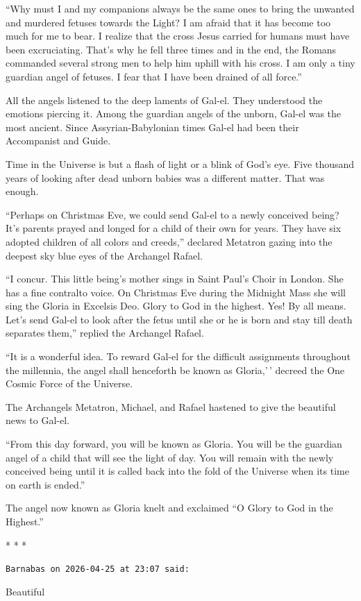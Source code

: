 ``Why must I and my companions always be the same ones to bring the unwanted and murdered fetuses towards the Light? I am afraid that it has become too much for me to bear. I realize that the cross Jesus carried for humans must have been excruciating. That's why he fell three times and in the end, the Romans commanded several strong men to help him uphill with his cross. I am only a tiny guardian angel of fetuses. I fear that I have been drained of all force.''

All the angels listened to the deep laments of Gal-el. They understood the emotions piercing it. Among the guardian angels of the unborn, Gal-el was the most ancient. Since Assyrian-Babylonian times Gal-el had been their Accompanist and Guide.

Time in the Universe is but a flash of light or a blink of God's eye. Five thousand years of looking after dead unborn babies was a different matter. That was enough.

``Perhaps on Christmas Eve, we could send Gal-el to a newly conceived being? It's parents prayed and longed for a child of their own for years. They have six adopted children of all colors and creeds,'' declared Metatron gazing into the deepest sky blue eyes of the Archangel Rafael.

``I concur. This little being's mother sings in Saint Paul's Choir in London. She has a fine contralto voice. On Christmas Eve during the Midnight Mass she will sing the Gloria in Excelsis Deo. Glory to God in the highest. Yes! By all means. Let's send Gal-el to look after the fetus until she or he is born and stay till death separates them,'' replied the Archangel Rafael.

``It is a wonderful idea. To reward Gal-el for the difficult assignments throughout the millennia, the angel shall henceforth be known as Gloria,'\,' decreed the One Cosmic Force of the Universe.

The Archangels Metatron, Michael, and Rafael hastened to give the beautiful news to Gal-el.

``From this day forward, you will be known as Gloria. You will be the guardian angel of a child that will see the light of day. You will remain with the newly conceived being until it is called back into the fold of the Universe when its time on earth is ended.''

The angel now known as Gloria knelt and exclaimed ``O Glory to God in the Highest.''



\begin{center}* * *\end{center}

\begin{footnotesize}
\begin{sffamily}
\texttt{Barnabas on 2026-04-25 at 23:07 said:}

Beautiful


\hfill

\end{sffamily}
\end{footnotesize}

